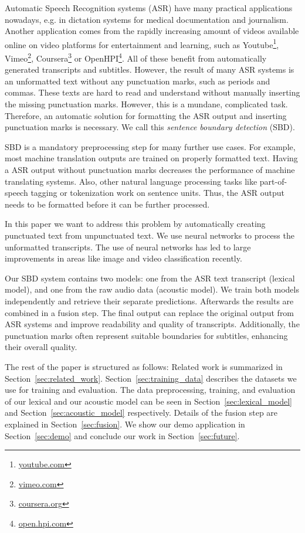 Automatic Speech Recognition systems (ASR) have many practical applications nowadays, e.g. in dictation systems for medical documentation and journalism.
Another application comes from the rapidly increasing amount of videos available online on video platforms for entertainment and learning, such as Youtube\footnote{\url{youtube.com}}, Vimeo\footnote{\url{vimeo.com}}, Coursera\footnote{\url{coursera.org}} or OpenHPI\footnote{\url{open.hpi.com}}.
All of these benefit from automatically generated transcripts and subtitles.
However, the result of many ASR systems is an unformatted text without any punctuation marks, such as periods and commas.
These texts are hard to read and understand without manually inserting the missing punctuation marks.
However, this is a mundane, complicated task.
Therefore, an automatic solution for formatting the ASR output and inserting punctuation marks is necessary.
We call this \emph{sentence boundary detection} (SBD).

SBD is a mandatory preprocessing step for many further use cases.
For example, most machine translation outputs are trained on properly formatted text.
Having a ASR output without punctuation marks decreases the performance of machine translating systems.
Also, other natural language processing tasks like part-of-speech tagging or tokenization work on sentence units.
Thus, the ASR output needs to be formatted before it can be further processed.

In this paper we want to address this problem by automatically creating punctuated text from unpunctuated text.
We use neural networks to process the unformatted transcripts.
The use of neural networks has led to large improvements in areas like image and video classification recently.

Our SBD system contains two models: one from the ASR text transcript (lexical model), and one from the raw audio data (acoustic model).
We train both models independently and retrieve their separate predictions.
Afterwards the results are combined in a fusion step.
The final output can replace the original output from ASR systems and improve readability and quality of transcripts.
Additionally, the punctuation marks often represent suitable boundaries for subtitles, enhancing their overall quality.

The rest of the paper is structured as follows:
Related work is summarized in Section~\ref{sec:related_work}.
Section~\ref{sec:training_data} describes the datasets we use for training and evaluation.
The data preprocessing, training, and evaluation of our lexical and our acoustic model can be seen in Section~\ref{sec:lexical_model} and Section~\ref{sec:acoustic_model} respectively.
Details of the fusion step are explained in Section~\ref{sec:fusion}.
We show our demo application in Section~\ref{sec:demo} and conclude our work in Section~\ref{sec:future}.
